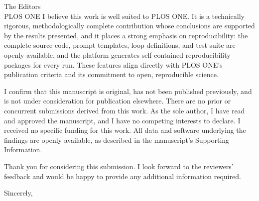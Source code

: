 \documentclass[11pt,letterpaper]{letter}
\begin{document}
\begin{letter}{The Editors \\ PLOS ONE}
I believe this work is well suited to PLOS ONE. It is a technically rigorous, methodologically complete contribution whose conclusions are supported by the results presented, and it places a strong emphasis on reproducibility: the complete source code, prompt templates, loop definitions, and test suite are openly available, and the platform generates self-contained reproducibility packages for every run. These features align directly with PLOS ONE's publication criteria and its commitment to open, reproducible science.

I confirm that this manuscript is original, has not been published previously, and is not under consideration for publication elsewhere. There are no prior or concurrent submissions derived from this work. As the sole author, I have read and approved the manuscript, and I have no competing interests to declare. I received no specific funding for this work. All data and software underlying the findings are openly available, as described in the manuscript's Supporting Information.

Thank you for considering this submission. I look forward to the reviewers' feedback and would be happy to provide any additional information required.

\closing{Sincerely,}

\end{letter}
\end{document}
